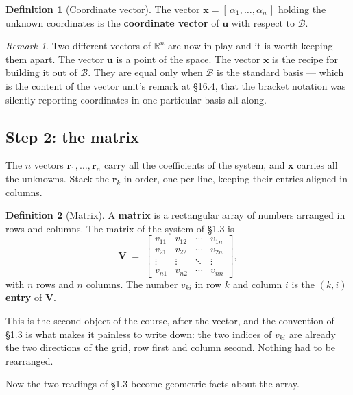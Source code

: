 \documentclass[11pt]{article}
\theoremstyle{plain}
\theoremstyle{definition}
\newtheorem{defn}{Definition}[section]
\theoremstyle{remark}
\newtheorem*{rmk}{Remark}
\newcommand{\R}{\mathbb{R}}
\newcommand{\vc}[1]{\mathbf{#1}}        %
\newcommand{\mt}[1]{\mathbf{#1}}        %
\newcommand{\bas}{\mathcal{B}}
\begin{document}
\begin{defn}[Coordinate vector]
The vector $\vc{x}=[\,\alpha_1,\dots,\alpha_n\,]$ holding the unknown
coordinates is the \textbf{coordinate vector} of $\vc{u}$ with respect to
$\bas$.
\end{defn}

\begin{rmk}
Two different vectors of $\R^{n}$ are now in play and it is worth keeping them
apart. The vector $\vc{u}$ is a point of the space. The vector $\vc{x}$ is the
recipe for building it out of $\bas$. They are equal only when $\bas$ is the
standard basis --- which is the content of the vector unit's remark at \S16.4,
that the bracket notation was silently reporting coordinates in one particular
basis all along.
\end{rmk}

\subsection{Step 2: the matrix}
The $n$ vectors $\vc{r}_1,\dots,\vc{r}_n$ carry all the coefficients of the
system, and $\vc{x}$ carries all the unknowns. Stack the $\vc{r}_k$ in order,
one per line, keeping their entries aligned in columns.

\begin{defn}[Matrix]
A \textbf{matrix} is a rectangular array of numbers arranged in rows and
columns. The matrix of the system of \S1.3 is
\[
  \mt{V} \;=\;
  \begin{bmatrix}
    v_{11} & v_{12} & \cdots & v_{1n} \\
    v_{21} & v_{22} & \cdots & v_{2n} \\
    \vdots & \vdots & \ddots & \vdots \\
    v_{n1} & v_{n2} & \cdots & v_{nn}
  \end{bmatrix},
\]
with $n$ rows and $n$ columns. The number $v_{ki}$ in row $k$ and column $i$ is
the \textbf{$(k,i)$ entry} of $\mt{V}$.
\end{defn}

\noindent This is the second object of the course, after the vector, and the
convention of \S1.3 is what makes it painless to write down: the two indices of
$v_{ki}$ are already the two directions of the grid, row first and column
second. Nothing had to be rearranged.

Now the two readings of \S1.3 become geometric facts about the array.
\end{document}
